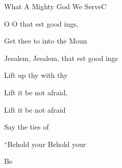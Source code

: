 \begin{song}{What A Mighty God We Serve}{C}
\begin{SBExtraKeys}
{    \begin{SBVerse}
      O  O  that est good ings,
                
      Get thee  to into the  Moun

      Jesalem, Jesalem, that est good ings

      Lift up thy  with  thy 

      Lift it  be not afraid,

      Lift it  be not afraid

      Say  the ties of 

      ``Behold your  Behold your 

      Be  
    \end{SBVerse}
  }\end{SBExtraKeys}
\end{song}


